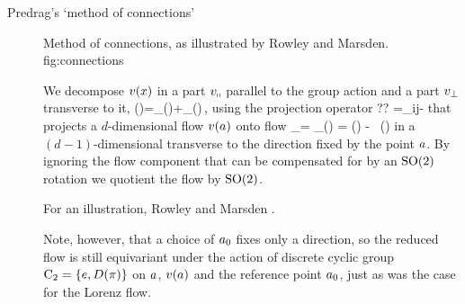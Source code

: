 \begin{description}
\item[Predrag's `method of connections']

%
{}{
Method of connections, as illustrated by Rowley and
Marsden.
}
{fig:connections}
%


We decompose $v(x)$
in a part $v_\shortparallel$ parallel
to the group action and a part $v_\perp$ transverse to it,
\beq
	\vel(\ssp)=\vel_\shortparallel(\ssp)+\vel_\perp(\ssp)\,,
using the projection operator
\beq
 	?? %
 =\delta_{ij}-
that projects a $d$-dimensional flow $v(a)$ onto
flow
\beq
	\dot{\ssp}_\perp = \vel_\perp(\ssp) = \vel(\ssp)
    - 
      \, \groupTan(\ssp)
in a $(d\!-\!1)$-dimensional {\csection} transverse to the
direction fixed by the point $a$. By ignoring the flow
component that can be compensated for by an $\textrm{SO}(2)$
rotation we quotient the flow by $\textrm{SO}(2)$.

For an illustration, Rowley and
Marsden .


Note, however, that a choice of $a_0$ fixes only a
direction, so the reduced flow is still equivariant under the
action of discrete cyclic group $\textrm{C}_2 = \{e,D(\pi)\}$ on
$a$, $v(a)$ and the reference point $a_0$, just
as was the case %
for the Lorenz flow. %



\end{description}

